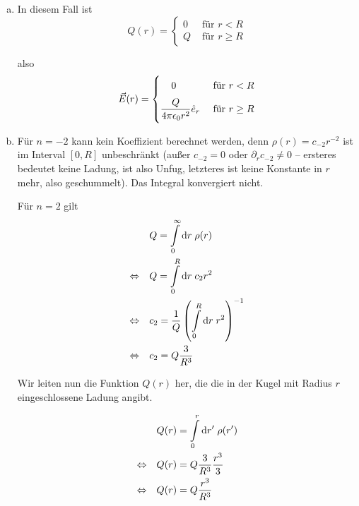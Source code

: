 \documentclass[a4paper,german,12pt,smallheadings]{scrartcl}
\begin{document}
\begin{enumerate}[a)]
  \item
    In diesem Fall ist
    \begin{equation}
      Q(r) = \begin{cases}
        0 & \text{ für } r < R \\
        Q & \text{ für } r \ge R
      \end{cases}
    \end{equation}

    also
    \begin{equation}
      \vec{E}(r) = \begin{cases}
        \; \; \; \; 0 & \text{ für } r < R
        \vspace{0.2 cm} \\
        \dfrac{Q}{4 \pi \epsilon_0 r^2} \hat{e}_r & \text{ für } r \ge R
      \end{cases}
    \end{equation}

  \item
    Für $n = -2$ kann kein Koeffizient berechnet werden, denn $\rho(r) =
    c_{-2}r^{-2}$ ist im Interval $[0, R]$ unbeschränkt (außer $c_{-2} = 0$
    oder $\partial_r c_{-2} \neq 0$ -- ersteres bedeutet keine Ladung, ist also
    Unfug, letzteres ist keine Konstante in $r$ mehr, also geschummelt). Das
    Integral konvergiert nicht.

    Für $n = 2$ gilt
    \begin{align}
      &Q = \int\limits_0^\infty \dif r \; \rho(r) \\
      \Leftrightarrow\quad
      &Q = \int\limits_0^R \dif r \; c_2r^2 \\
      \Leftrightarrow\quad
      &c_2 = \frac{1}{Q} \del{\int\limits_0^R \dif r \; r^2}^{-1} \\
      \Leftrightarrow\quad
      &c_2 = Q \frac{3}{R^3}
    \end{align}

    Wir leiten nun die Funktion $Q(r)$ her, die die in der Kugel mit Radius $r$
    eingeschlossene Ladung angibt.

    \begin{align}
      &Q(r) = \int\limits_0^r \dif r' \; \rho(r') \\
      \Leftrightarrow\quad
      &Q(r) = Q \frac{3}{R^3} \frac{r^3}{3} \\
      \Leftrightarrow\quad
      &Q(r) = Q \frac{r^3}{R^3}
    \end{align}


\end{enumerate}
\end{document}
